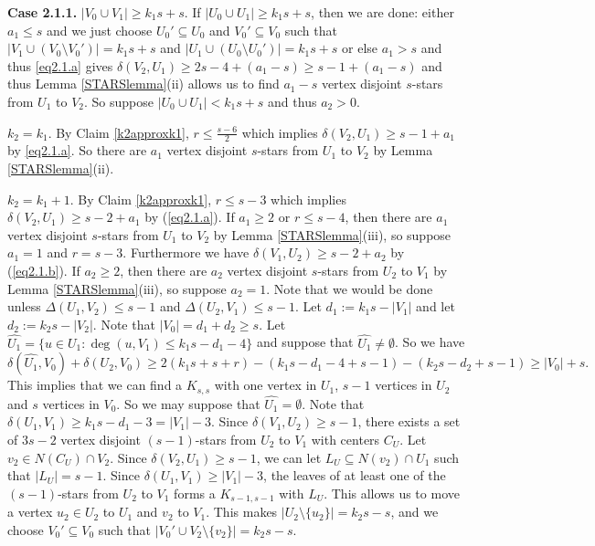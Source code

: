 \documentclass[oneside,12pt]{memoir}
\begin{document}
\textbf{Case 2.1.1.} $|V_0\cup V_1|\geq k_1s+s$.  If $|U_0\cup U_1|\geq k_1s+s$, then we are done: either $a_1\leq s$ and we just choose $U_0'\subseteq U_0$ and $V_0'\subseteq V_0$ such that $|V_1\cup (V_0\setminus V_0')|=k_1s+s$ and $|U_1\cup (U_0\setminus U_0')|=k_1s+s$ or else $a_1> s$ and thus \eqref{eq2.1.a} gives $\delta(V_2, U_1)\geq 2s-4+(a_1-s)\geq s-1+(a_1-s)$ and thus Lemma \ref{STARSlemma}(ii) allows us to find $a_1-s$ vertex disjoint $s$-stars from $U_1$ to $V_2$.  So suppose $|U_0\cup U_1|<k_1s+s$ and thus $a_2>0$.  

$k_2=k_1$.  By Claim \ref{k2approxk1}, $r\leq \frac{s-6}{2}$ which implies $\delta(V_2, U_1)\geq s-1+a_1$ by \eqref{eq2.1.a}.  So there are $a_1$ vertex disjoint $s$-stars from $U_1$ to $V_2$ by Lemma \ref{STARSlemma}(ii).

$k_2=k_1+1$.  By Claim \ref{k2approxk1}, $r\leq s-3$ which implies $\delta(V_2, U_1)\geq s-2+a_1$ by (\ref{eq2.1.a}).  If $a_1\geq 2$ or $r\leq s-4$, then there are $a_1$ vertex disjoint $s$-stars from $U_1$ to $V_2$ by Lemma \ref{STARSlemma}(iii), so suppose $a_1=1$ and $r=s-3$.  Furthermore we have $\delta(V_1, U_2)\geq s-2+a_2$ by (\ref{eq2.1.b}).  If $a_2\geq 2$, then there are $a_2$ vertex disjoint $s$-stars from $U_2$ to $V_1$ by Lemma \ref{STARSlemma}(iii), so suppose $a_2=1$.  Note that we would be done unless $\Delta(U_1, V_2)\leq s-1$ and $\Delta(U_2, V_1)\leq s-1$.  Let $d_1:=k_1s-|V_1|$ and let $d_2:=k_2s-|V_2|$.  Note that $|V_0|=d_1+d_2\geq s$.  
Let $\hat{U_1}=\{u\in U_1:\deg(u, V_1)\leq k_1s-d_1-4\}$ and suppose that $\hat{U_1}\neq \emptyset$.  
So we have $$\delta(\hat{U_1}, V_0)+\delta(U_2, V_0)\geq 2(k_1s+s+r)-(k_1s-d_1-4+s-1)-(k_2s-d_2+s-1)\geq |V_0|+s.$$
This implies that we can find a $K_{s,s}$ with one vertex in $U_1$, $s-1$ vertices in $U_2$ and $s$ vertices in $V_0$.  So we may suppose that $\hat{U_1}=\emptyset$.  Note that $\delta(U_1, V_1)\geq k_1s-d_1-3=|V_1|-3$.  Since $\delta(V_1, U_2)\geq s-1$, there exists a set of $3s-2$ vertex disjoint $(s-1)$-stars from $U_2$ to $V_1$ with centers $C_U$.  Let $v_2\in N(C_U)\cap V_2$. Since $\delta(V_2, U_1)\geq s-1$, we can let $L_U\subseteq N(v_2)\cap U_1$ such that $|L_U|=s-1$.  Since $\delta(U_1, V_1)\geq |V_1|-3$, the leaves of at least one of the $(s-1)$-stars from $U_2$ to $V_1$ forms a $K_{s-1,s-1}$ with $L_U$.  This allows us to move a vertex $u_2\in U_2$ to $U_1$ and $v_2$ to $V_1$. This makes $|U_2\setminus \{u_2\}|=k_2s-s$, and we choose $V_0'\subseteq V_0$ such that $|V_0'\cup V_2\setminus\{v_2\}|=k_2s-s$.
\end{document}
